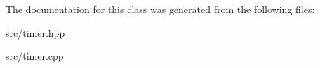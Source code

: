 The documentation for this class was generated from the following files\+:\begin{DoxyCompactItemize}
\item 
src/timer.\+hpp\item 
src/timer.\+cpp\end{DoxyCompactItemize}
